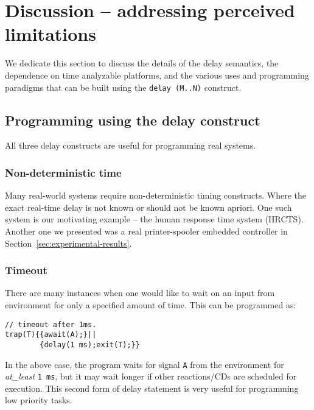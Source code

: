 \section{Discussion -- addressing perceived limitations}
\label{sec:disc-perc-limit}

We dedicate this section to discuss the details of the delay semantics,
the dependence on time analyzable platforms, and the various uses and
programming paradigms that can be built using the \texttt{delay (M..N)}
construct.

\subsection{Programming using the delay construct}
\label{sec:progr-using-delay}

All three delay constructs are useful for programming real systems. %

\subsubsection{Non-deterministic time}
\label{sec:non-determ-time}

Many real-world systems require non-deterministic timing
constructs. Where the exact real-time delay is not known or should not
be known apriori. One such system is our motivating example -- the human
response time system (HRCTS). Another one we presented was a real
printer-spooler embedded controller in
Section~\ref{sec:experimental-results}.

\subsubsection{Timeout}
\label{sec:timeout}

There are many instances when one would like to wait on an input from
environment for only a specified amount of time. This can be programmed
as:
{\small
\begin{verbatim}
// timeout after 1ms.
trap(T){{await(A);}||
        {delay(1 ms);exit(T);}}
\end{verbatim}
}

In the above case, the program waits for signal \texttt{A} from the
environment for \textit{at\_least} \texttt{1 ms}, but it may wait longer
if other reactions/CDs are scheduled for execution. This second form of
delay statement is very useful for programming low priority tasks.

